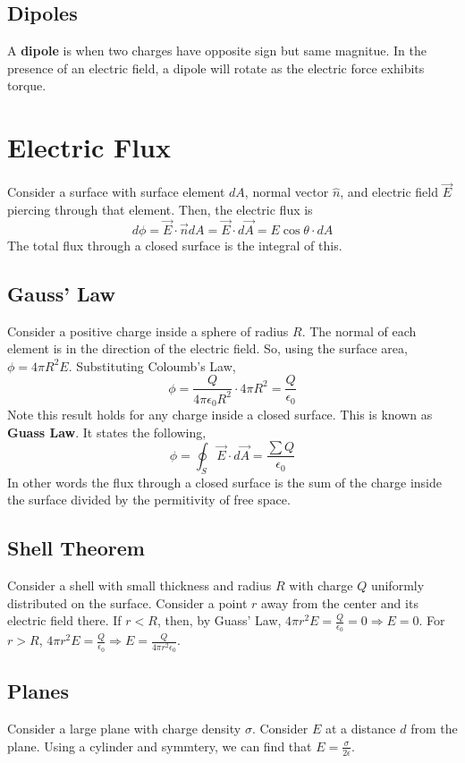 \documentclass{article}
\begin{document}
\subsection{Dipoles}
A \textbf{dipole} is when two charges have opposite sign but same magnitue.
In the presence of an electric field, a dipole will rotate as the electric force
exhibits torque.

\section{Electric Flux}
Consider a surface with surface element $dA$, normal vector $\hat{n}$,
and electric field $\vec{E}$ piercing through that element. Then,
the electric flux is $$d\phi =\vec{E}\cdot \vec{n}dA=\vec{E}\cdot d\vec{A}
=E\cos \theta\cdot dA$$
The total flux through a closed surface is the integral of this.

\subsection{Gauss' Law}
Consider a positive charge inside a sphere of radius $R$. The normal of each element is 
in the direction of the electric field. So, using the surface area, $\phi=4\pi R^{2}E$.
Substituting Coloumb's Law, 
$$\phi=\frac{Q}{4\pi \epsilon_{0}R^{2}}\cdot 4\pi R^{2}=\frac{Q}{\epsilon_{0}}$$
Note this result holds for any charge inside a closed surface. This is known as \textbf{Guass Law}.
It states the following,
$$\phi=\oint_{S}\vec{E}\cdot d\vec{A}=\frac{\sum Q}{\epsilon_{0}}$$
In other words the flux through a closed surface is the sum of the charge inside the surface
divided by the permitivity of free space. 

\subsection{Shell Theorem}
Consider a shell with small thickness and radius $R$ with charge $Q$ uniformly distributed on the surface.
Consider a point $r$ away from the center and its electric field there. If $r<R$,
then, by Guass' Law, $4\pi r^{2}E=\frac{Q}{\epsilon_{0}}=0\Rightarrow E=0$. For $r>R$,
$4\pi r^{2}E=\frac{Q}{\epsilon_{0}}\Rightarrow E=\frac{Q}{4\pi r^{2}\epsilon_{0}}$.

\subsection{Planes}
Consider a large plane with charge density $\sigma$. Consider $E$ at a distance $d$ from the plane.
Using a cylinder and symmtery, we can find that $E=\frac{\sigma}{2\epsilon}$. 
\end{document}
